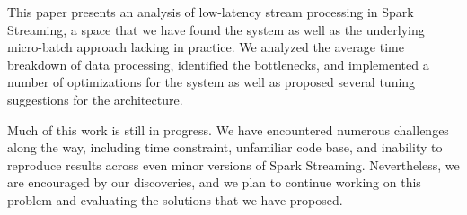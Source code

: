 This paper presents an analysis of low-latency stream processing in Spark Streaming, a space that we have found the system as well as the underlying micro-batch approach lacking in practice.
We analyzed the average time breakdown of data processing, identified the bottlenecks, and implemented a number of optimizations for the system as well as proposed several tuning suggestions for the architecture.

Much of this work is still in progress. We have encountered numerous challenges along the way, including time constraint, unfamiliar code base, and inability to reproduce results across even minor versions of Spark Streaming. Nevertheless, we are encouraged by our discoveries, and we plan to continue working on this problem and evaluating the solutions that we have proposed. 
